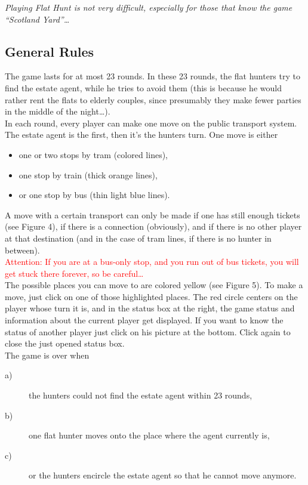 \emph{Playing Flat Hunt is not very difficult, especially for those that know the game ``Scotland Yard''\ldots}\\

\subsection{General Rules}

 The game lasts for at most 23 rounds. In these 23 rounds, the flat hunters try to find the estate agent, while he tries to avoid them (this is because he would rather rent the flats to elderly couples, since presumably they make fewer parties in the middle of the night\ldots).\\

In each round, every player can make one move on the public transport system. The estate agent is the first, then it's the hunters turn. One move is either 

\begin{itemize}
  \item  one or two stops by tram (colored lines),
  \item  one stop by train (thick orange lines),
  \item  or one stop by bus (thin light blue lines).
\end{itemize}

 A move with a certain transport can only be made if one has still enough tickets (see Figure 4), if there is a connection (obviously), and if there is no other player at that destination (and in the case of tram lines, if there is no hunter in between).\\

 \textcolor{red}{Attention: If you are at a bus-only stop, and you run out of bus tickets, you will get stuck there forever, so be careful\ldots}\\

The possible places you can move to are colored yellow (see Figure 5). To make a move, just click on one of those highlighted places. The red circle centers on the player whose turn it is, and in the status box at the right, the game status and information about the current player get displayed. If you want to know the status of another player just click on his picture at the bottom. Click again to close the just opened status box.\\

The game is over when

  \begin{description}
    \item[a)]the hunters could not find the estate agent within 23 rounds,
    \item[b)]one flat hunter moves onto the place where the agent currently is,
    \item[c)]or the hunters encircle the estate agent so that he cannot move anymore.
  \end{description}

